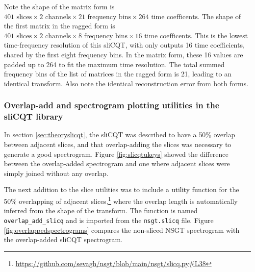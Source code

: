 \documentclass[report.tex]{subfiles}
\begin{document}
Note the shape of the matrix form is $401 \text{ slices} \times 2 \text{ channels} \times 21 \text{ frequency bins} \times 264 \text{ time coefficents}$. The shape of the first matrix in the ragged form is $401 \text{ slices} \times 2 \text{ channels} \times 8 \text{ frequency bins} \times 16 \text{ time coefficents}$. This is the lowest time-frequency resolution of this sliCQT, with only outputs 16 time coefficients, shared by the first eight frequency bins. In the matrix form, these 16 values are padded up to 264 to fit the maximum time resolution. The total summed frequency bins of the list of matrices in the ragged form is 21, leading to an identical transform. Also note the identical reconstruction error from both forms.

\subsubsection{Overlap-add and spectrogram plotting utilities in the sliCQT library}
\label{sec:slicqtutil}

In section \ref{sec:theoryslicqt}, the sliCQT was described to have a 50\% overlap between adjacent slices, and that overlap-adding the slices was necessary to generate a good spectrogram. Figure \ref{fig:slicqtukeys} showed the difference between the overlap-added spectrogram and one where adjacent slices were simply joined without any overlap.

The next addition to the slice utilities was to include a utility function for the 50\% overlapping of adjacent slices,\footnote{\url{https://github.com/sevagh/nsgt/blob/main/nsgt/slicq.py\#L38}} where the overlap length is automatically inferred from the shape of the transform. The function is named \Verb#overlap_add_slicq# and is imported from the \Verb#nsgt.slicq# file. Figure \ref{fig:overlappedspectrograms} compares the non-sliced NSGT spectrogram with the overlap-added sliCQT spectrogram.
\end{document}
